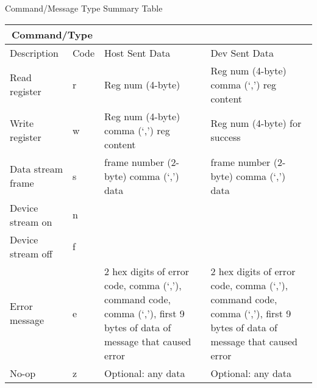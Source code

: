 \documentclass{customdocclass}
\begin{document}
\begin{center}
\small
Command/Message Type Summary Table
\begin{tabularx}{\textwidth}{|X|l|X|X|} \hline
\multicolumn{2}{|c|}{Command/Type} & & \\ \hline
Description & Code & Host Sent Data & Dev Sent Data \\ \hline
Read register & r & Reg num (4-byte) & Reg num (4-byte) comma (`,') reg content \\ \hline
Write register & w & Reg num (4-byte) comma (`,') reg content & Reg num (4-byte) for success \\ \hline
Data stream frame & s & frame number (2-byte) comma (`,') data &  frame number (2-byte) comma (`,') data \\ \hline
Device stream on & n & & \\ \hline
Device stream off & f & & \\ \hline
Error message & e & 2 hex digits of error code, comma (`,'), command code, comma (`,'), first 9 bytes of data of message that caused error & 2 hex digits of error code, comma (`,'), command code, comma (`,'), first 9 bytes of data of message that caused error \\ \hline
No-op & z & Optional: any data & Optional: any data \\ \hline
\end{tabularx}
\end{center}
\end{document}
